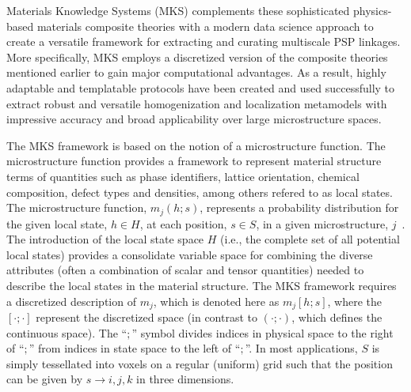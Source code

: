 \documentclass{bmcart}
\begin{document}
 Materials Knowledge Systems (MKS) \cite{landi2010multi, kalidindi2010novel, yabansu2014calibrated, al2012multi, kalidindi2011microstructure, gupta2015structure,  cceccen2014data} complements these sophisticated physics-based materials composite theories with a modern data science approach to create a versatile framework for extracting and curating multiscale PSP linkages. More specifically, MKS employs a discretized version of the composite theories mentioned earlier to gain major computational advantages. As a result, highly adaptable and templatable protocols have been created and used successfully to extract robust and versatile homogenization and localization metamodels with impressive accuracy and broad applicability over large microstructure spaces.

The MKS framework is based on the notion of a microstructure function.
The microstructure function provides a framework to represent material
structure terms of quantities such as phase identifiers, lattice
orientation, chemical composition, defect types and densities,
among others refered to as local states. The microstructure function,
$m_j \left(h; s\right)$, represents a
probability distribution for the given local state, $h \in H$, at
each position, $s \in S$, in a given microstructure,
$j$~\cite{niezgoda2013novel, niezgoda2011understanding,
qidwai2012estimating, niezgoda2010optimized}. The
introduction of the local state space $H$ (i.e., the complete set of
all potential local states) provides a consolidate variable space for
combining the diverse attributes (often a combination of
scalar and tensor quantities) needed to describe the
local states in the material structure.
The MKS framework requires a discretized description of $m_j$, which is
denoted here as $m_j\left[h; s\right]$, where the
$\left[\cdot;\cdot\right]$ represent the discretized space (in contrast
to $\left(\cdot;\cdot\right)$, which defines the continuous space).
The ``$;$'' symbol divides indices in physical space to the right of
``$;$'' from indices in state space to the left of ``$;$''. In most
applications, $S$ is simply tessellated into voxels
on a regular (uniform) grid such that the position can
be given by $s\rightarrow i,j,k$ in three dimensions.
\end{document}

